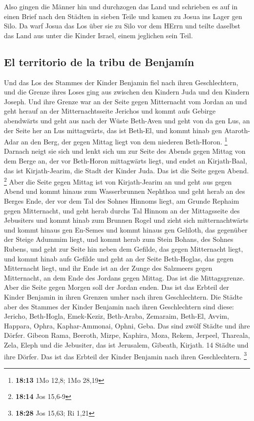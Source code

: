  Also gingen die Männer hin und durchzogen das Land und
schrieben es auf in einen Brief nach den Städten in sieben Teile und
kamen zu Josua ins Lager gen Silo.  Da warf Josua das Los
über sie zu Silo vor dem HErrn und teilte daselbst das Land aus unter
die Kinder Israel, einem jeglichen sein Teil.

\hypertarget{el-territorio-de-la-tribu-de-benjamuxedn}{%
\subsection{El territorio de la tribu de
Benjamín}\label{el-territorio-de-la-tribu-de-benjamuxedn}}

 Und das Los des Stammes der Kinder Benjamin fiel nach
ihren Geschlechtern, und die Grenze ihres Loses ging aus zwischen den
Kindern Juda und den Kindern Joseph.  Und ihre Grenze war
an der Seite gegen Mitternacht vom Jordan an und geht herauf an der
Mitternachtsseite Jerichos und kommt aufs Gebirge abendwärts und geht
aus nach der Wüste Beth-Aven  und geht von da gen Lus, an
der Seite her an Lus mittagwärts, das ist Beth-El, und kommt hinab gen
Ataroth-Adar an den Berg, der gegen Mittag liegt von dem niederen
Beth-Horon. \footnote{\textbf{18:13} 1Mo 12,8; 1Mo 28,19}
 Darnach neigt sie sich und lenkt sich um zur Seite des
Abends gegen Mittag von dem Berge an, der vor Beth-Horon mittagwärts
liegt, und endet an Kirjath-Baal, das ist Kirjath-Jearim, die Stadt der
Kinder Juda. Das ist die Seite gegen Abend. \footnote{\textbf{18:14} Jos
  15,6-9}  Aber die Seite gegen Mittag ist von
Kirjath-Jearim an und geht aus gegen Abend und kommt hinaus zum
Wasserbrunnen Nephthoa  und geht herab an des Berges
Ende, der vor dem Tal des Sohnes Hinnoms liegt, am Grunde Rephaim gegen
Mitternacht, und geht herab durchs Tal Hinnom an der Mittagsseite des
Jebusiters und kommt hinab zum Brunnen Rogel  und zieht
sich mitternachtwärts und kommt hinaus gen En-Semes und kommt hinaus gen
Geliloth, das gegenüber der Steige Adummim liegt, und kommt herab zum
Stein Bohans, des Sohnes Rubens,  und geht zur Seite hin
neben dem Gefilde, das gegen Mitternacht liegt, und kommt hinab aufs
Gefilde  und geht an der Seite Beth-Hoglas, das gegen
Mitternacht liegt, und ihr Ende ist an der Zunge des Salzmeers gegen
Mitternacht, an dem Ende des Jordans gegen Mittag. Das ist die
Mittagsgrenze.  Aber die Seite gegen Morgen soll der
Jordan enden. Das ist das Erbteil der Kinder Benjamin in ihren Grenzen
umher nach ihren Geschlechtern.  Die Städte aber des
Stammes der Kinder Benjamin nach ihren Geschlechtern sind diese:
Jericho, Beth-Hogla, Emek-Keziz,  Beth-Araba, Zemaraim,
Beth-El,  Avvim, Happara, Ophra, 
Kaphar-Ammonai, Ophni, Geba. Das sind zwölf Städte und ihre Dörfer.
 Gibeon Rama, Beeroth,  Mizpe, Kaphira,
Moza,  Rekem, Jerpeel, Thareala,  Zela,
Eleph und die Jebusiter, das ist Jerusalem, Gibeath, Kirjath. 14 Städte
und ihre Dörfer. Das ist das Erbteil der Kinder Benjamin nach ihren
Geschlechtern. \footnote{\textbf{18:28} Jos 15,63; Ri 1,21}

